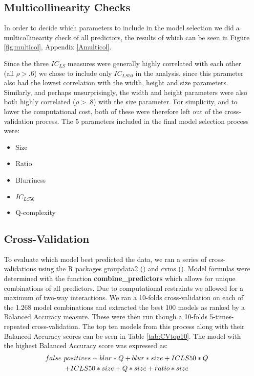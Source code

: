 \documentclass[12pt]{article}
\newcommand{\mytilde}{\raise.17ex\hbox{$\scriptstyle\mathtt{\sim}$}} %
\begin{document}
\subsection{Multicollinearity Checks}
In order to decide which parameters to include in the model selection we did a multicollinearity check of all predictors, the results of which can be seen in Figure \ref{fig:multicol}, Appendix \ref{Amulticol}.

Since the three $IC_{LS}$ measures were generally highly correlated with each other (all $\rho > .6$) we chose to include only $IC_{LS50}$ in the analysis, since this parameter also had the lowest correlation with the width, height and size parameters. 
Similarly, and perhaps unsurprisingly, the width and height parameters were also both highly correlated ($\rho > .8$) with the size parameter. For simplicity, and to lower the computational cost, both of these were therefore left out of the cross-validation process.
The 5 parameters included in the final model selection process were:
\begin{itemize}
	\item Size
	\item Ratio
	\item Blurriness
	\item $IC_{LS50}$
	\item Q-complexity
\end{itemize}

\subsection{Cross-Validation}
To evaluate which model best predicted the data, we ran a series of cross-validations using the R packages groupdata2 (\cite{olsenGroupdata22020}) and cvms (\cite{olsenCvms2020}).
Model formulas were determined with the function \textbf{combine\_predictors} which allows for unique combinations of all predictors. Due to computational restraints we allowed for a maximum of two-way interactions. We ran a 10-folds cross-validation on each of the 1.268 model combinations and extracted the best 100 models as ranked by a Balanced Accuracy measure. These were then run though a 10-folds 5-times-repeated cross-validation. The top ten models from this process along with their Balanced Accuracy scores can be seen in Table \ref{tab:CVtop10}. The model with the highest Balanced Accuracy score was expressed as:
\begin{multline*}
		 false \ positives \ \mytilde \ blur*Q + blur*size + ICLS50*Q\\
		  + ICLS50*size + Q*size + ratio*size
	\label{eq:bestmodel}
\end{multline*} 
\end{document}

